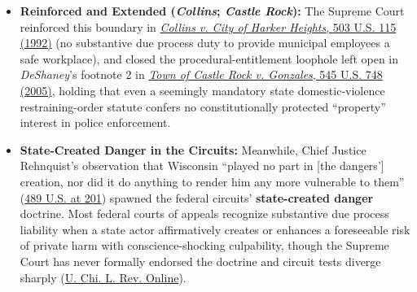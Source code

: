 \documentclass[12pt]{article}
\begin{document}
\begin{itemize}

\item \textbf{Reinforced and Extended (\textit{Collins}; \textit{Castle Rock}):} The Supreme Court reinforced this boundary in \href{https://www.law.cornell.edu/supremecourt/text/503/115}{\textit{Collins v. City of Harker Heights}, 503 U.S. 115 (1992)} (no substantive due process duty to provide municipal employees a safe workplace), and closed the procedural-entitlement loophole left open in \textit{DeShaney}'s footnote 2 in \href{https://supreme.justia.com/cases/federal/us/545/748/}{\textit{Town of Castle Rock v. Gonzales}, 545 U.S. 748 (2005)}, holding that even a seemingly mandatory state domestic-violence restraining-order statute confers no constitutionally protected ``property'' interest in police enforcement.

\item \textbf{State-Created Danger in the Circuits:} Meanwhile, Chief Justice Rehnquist's observation that Wisconsin ``played no part in [the dangers'] creation, nor did it do anything to render him any more vulnerable to them'' (\href{https://supreme.justia.com/cases/federal/us/489/189/}{489 U.S. at 201}) spawned the federal circuits' \textbf{state-created danger} doctrine. Most federal courts of appeals recognize substantive due process liability when a state actor affirmatively creates or enhances a foreseeable risk of private harm with conscience-shocking culpability, though the Supreme Court has never formally endorsed the doctrine and circuit tests diverge sharply (\href{https://lawreview.uchicago.edu/online-archive/exploring-statutory-remedies-state-created-dangers-after-fisher-v-moore}{U. Chi. L. Rev. Online}).

\end{itemize}
\end{document}
